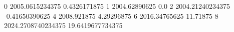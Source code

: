 0 2005.0615234375 0.4326171875
1 2004.62890625 0.0
2 2004.21240234375 -0.41650390625
4 2008.921875 4.29296875
6 2016.34765625 11.71875
8 2024.2708740234375 19.6419677734375
